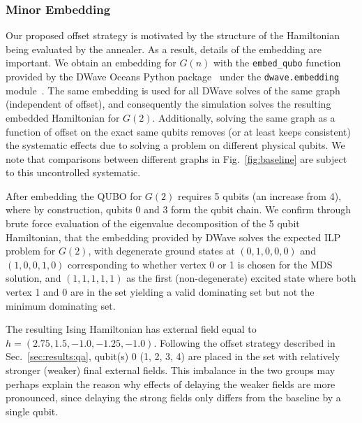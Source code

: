 \documentclass[prd,twocolumn,tightenlines,preprintnumbers,showpacs,superscriptaddress,notitlepage,nofootinbib,eqsecnum,floatfix,longbibliography,aps,10pt]{revtex4-2}
\begin{document}
\subsubsection{Minor Embedding}
\label{sec:methods:minor_embedding}
Our proposed offset strategy is motivated by the structure of the Hamiltonian being evaluated by the annealer.
As a result, details of the embedding are important. We obtain an embedding for $G(n)$ with the \texttt{embed\_qubo} function provided by the DWave Oceans Python package~\cite{dwave_oceans} under the \texttt{dwave.embedding} module~\cite{2008arXiv0804.4884C}.
The same embedding is used for all DWave solves of the same graph (independent of offset), and consequently the simulation solves the resulting embedded Hamiltonian for $G(2)$.
Additionally, solving the same graph as a function of offset on the exact same qubits removes (or at least keeps consistent) the systematic effects due to solving a problem on different physical qubits.
We note that comparisons between different graphs in Fig.~\ref{fig:baseline} are subject to this uncontrolled systematic.

After embedding the QUBO for $G(2)$ requires 5 qubits (an increase from 4), where by construction, qubits 0 and 3 form the qubit chain.
We confirm through brute force evaluation of the eigenvalue decomposition of the 5 qubit Hamiltonian, that the embedding provided by DWave solves the expected ILP problem for $G(2)$, with degenerate ground states at $(0, 1, 0, 0, 0)$ and $(1, 0, 0, 1, 0)$ corresponding to whether vertex 0 or 1 is chosen for the MDS solution, and $(1, 1, 1, 1, 1)$ as the first (non-degenerate) excited state where both vertex 1 and 0 are in the set yielding a valid dominating set but not the minimum dominating set.

The resulting Ising Hamiltonian has external field equal to $h = (2.75, 1.5, -1.0, -1.25, -1.0)$.
Following the offset strategy described in Sec.~\ref{sec:results:qa}, qubit(s) 0 (1, 2, 3, 4) are placed in the set with relatively stronger (weaker) final external fields.
This imbalance in the two groups may perhaps explain the reason why effects of delaying the weaker fields are more pronounced, since delaying the strong fields only differs from the baseline by a single qubit.



\end{document}
